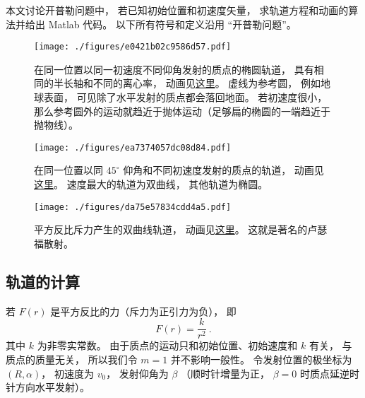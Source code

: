 

本文讨论开普勒问题中， 若已知初始位置和初速度矢量， 求轨道方程和动画的算法并给出 Matlab 代码。 以下所有符号和定义沿用 “开普勒问题”。
\begin{figure}[ht]
\centering
\texttt{[image: ./figures/e0421b02c9586d57.pdf]}
\caption{在同一位置以同一初速度不同仰角发射的质点的椭圆轨道， 具有相同的半长轴和不同的离心率， 动画见\href{https://wuli.wiki/apps/Kepler.html}{这里}。 虚线为参考圆， 例如地球表面， 可见除了水平发射的质点都会落回地面。 若初速度很小， 那么参考圆外的运动就趋近于抛体运动（足够扁的椭圆的一端趋近于抛物线）。} \label{fig_KepNum_1}
\end{figure}

\begin{figure}[ht]
\centering
\texttt{[image: ./figures/ea7374057dc08d84.pdf]}
\caption{在同一位置以同 $45^\circ$ 仰角和不同初速度发射的质点的轨道， 动画见\href{https://wuli.wiki/apps/Kepler2.html}{这里}。 速度最大的轨道为双曲线， 其他轨道为椭圆。} \label{fig_KepNum_2}
\end{figure}

\begin{figure}[ht]
\centering
\texttt{[image: ./figures/da75e57834cdd4a5.pdf]}
\caption{平方反比斥力产生的双曲线轨道， 动画见\href{https://wuli.wiki/apps/Kepler3.html}{这里}。 这就是著名的卢瑟福散射。} \label{fig_KepNum_3}
\end{figure}


\subsection{轨道的计算}
若 $F(r)$ 是平方反比的力（斥力为正引力为负）， 即
\begin{equation}
F(r) = \frac{k}{r^2}~.
\end{equation}
其中 $k$ 为非零实常数。 由于质点的运动只和初始位置、初始速度和 $k$ 有关， 与质点的质量无关， 所以我们令 $m=1$ 并不影响一般性。 令发射位置的极坐标为 $(R,\alpha)$， 初速度为 $v_0$， 发射仰角为 $\beta$ （顺时针增量为正， $\beta=0$ 时质点延逆时针方向水平发射）。

